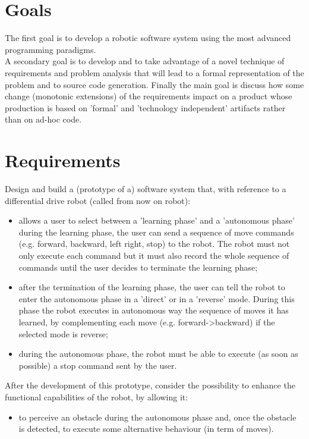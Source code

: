 \documentclass{llncs}
\newcommand{\labelsec}[1]{\label{sec:#1}}
\begin{document}
\section{Goals}
\labelsec{Goals}
The first goal is to develop a robotic software system using the most advanced programming paradigms.\\ 
A secondary goal is to develop and to take advantage of a novel technique of requirements and problem analysis that will lead to a formal representation of the problem and to source code generation.
Finally the main goal is discuss how some change (monotonic extensions) of the requirements impact on a product whose production is based on 'formal' and 'technology independent' artifacts rather than on ad-hoc code.
\labelsec{Goals}

\section{Requirements}
\labelsec{Requirements}
Design and build a (prototype of a) software system that, with reference to a differential drive robot (called from now on robot):
\begin{itemize}
	\item allows a user to select between a 'learning phase' and a 'autonomous phase'
    during the learning phase, the user can send a sequence of move commands (e.g. forward, backward, left right, stop) to the robot. The robot must not only execute each command but it must also record the whole sequence of commands until the user decides to terminate the learning phase;
    \item after the termination of the learning phase, the user can tell the robot to enter the autonomous phase in a 'direct' or in a 'reverse' mode. During this phase the robot executes in autonomous way the sequence of moves it has learned, by complementing each move (e.g. forward->backward) if the selected mode is reverse;
    \item during the autonomous phase, the robot must be able to execute (as soon as possible) a stop command sent by the user.
\end{itemize}
After the development of this prototype, consider the possibility to enhance the functional capabilities of the robot, by allowing it:
\begin{itemize}
	\item to perceive an obstacle during the autonomous phase and, once the obstacle is detected, to execute some alternative behaviour (in term of moves).
\end{itemize}
\end{document}
